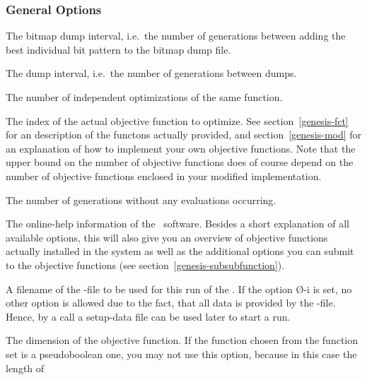 \subsubsection{General Options}\label{genesis-subsubgeneral}
		
\begin{Enumerate}
%
\item	{}
	The bitmap dump interval, i.e.~the number of generations between
	adding the best individual bit pattern to the bitmap dump file.
%
\item	{}
	The dump interval, i.e.~the number of generations between dumps.
%
\item	{}
	The number of independent optimizations of the same function.
%
\item	{}
	The index of the actual objective function to optimize.
	See section~\ref{genesis-fct} for an description of the 
	functons actually provided, and section~\ref{genesis-mod} 
	for an explanation of how to implement your own objective functions.
	Note that the upper bound on the number of objective functions does
	of course depend on the number of objective functions enclosed
	in your modified implementation.
%
\item	{}
	The number of generations without any evaluations occurring.
%
\item	{}
	The online-help information of the \GEN\ software.
	Besides a short explanation of all available options, this will
	also give you an overview of objective functions actually installed
	in the system as well as the additional options you can submit
	to the objective functions (see section~\ref{genesis-subsubfunction}).
%
\item	{}
	A filename of the -file to be used for this run of the \GA.
	If the option \O{-i} is set, no other option is allowed due
	to the fact, that all data is provided by the -file.
	Hence, by a call  a setup-data file can
	be used later to start a run.
%
\item	{}
	The dimension of the objective function.
	If the function chosen from the function set is a pseudoboolean one,
	you may not use this option, because in this case the length of

\end{Enumerate}
